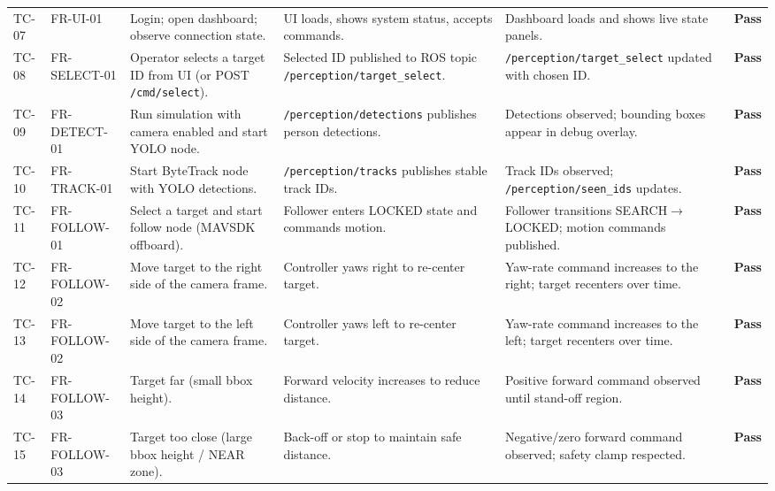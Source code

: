 \documentclass[12pt,a4paper]{report}
\newcommand{\statusPass}{\textcolor{green!45!black}{\textbf{Pass}}}
\begin{document}
\begin{landscape}
\begin{longtable}{@{}L{1.6cm} L{2.6cm} L{5.2cm} L{5.2cm} L{5.2cm} C{1.4cm}@{}}
TC-07 & FR-UI-01 &
Login; open dashboard; observe connection state. &
UI loads, shows system status, accepts commands. &
Dashboard loads and shows live state panels. &
\statusPass \\

TC-08 & FR-SELECT-01 &
Operator selects a target ID from UI (or POST \texttt{/cmd/select}). &
Selected ID published to ROS topic \texttt{/perception/target\_select}. &
\texttt{/perception/target\_select} updated with chosen ID. &
\statusPass \\

TC-09 & FR-DETECT-01 &
Run simulation with camera enabled and start YOLO node. &
\texttt{/perception/detections} publishes person detections. &
Detections observed; bounding boxes appear in debug overlay. &
\statusPass \\

TC-10 & FR-TRACK-01 &
Start ByteTrack node with YOLO detections. &
\texttt{/perception/tracks} publishes stable track IDs. &
Track IDs observed; \texttt{/perception/seen\_ids} updates. &
\statusPass \\

TC-11 & FR-FOLLOW-01 &
Select a target and start follow node (\ac{MAVSDK} offboard). &
Follower enters LOCKED state and commands motion. &
Follower transitions SEARCH$\rightarrow$LOCKED; motion commands published. &
\statusPass \\

TC-12 & FR-FOLLOW-02 &
Move target to the right side of the camera frame. &
Controller yaws right to re-center target. &
Yaw-rate command increases to the right; target recenters over time. &
\statusPass \\

TC-13 & FR-FOLLOW-02 &
Move target to the left side of the camera frame. &
Controller yaws left to re-center target. &
Yaw-rate command increases to the left; target recenters over time. &
\statusPass \\

TC-14 & FR-FOLLOW-03 &
Target far (small bbox height). &
Forward velocity increases to reduce distance. &
Positive forward command observed until stand-off region. &
\statusPass \\

TC-15 & FR-FOLLOW-03 &
Target too close (large bbox height / NEAR zone). &
Back-off or stop to maintain safe distance. &
Negative/zero forward command observed; safety clamp respected. &
\statusPass \\


\end{longtable}
\end{landscape}
\end{document}
